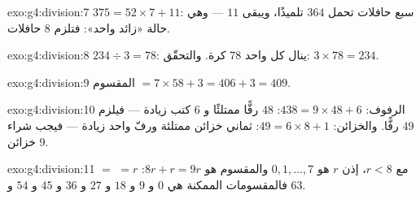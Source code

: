 \begin{solution}{exo:g4:division:7}
$375 = 52 \times 7 + 11$: سبع حافلات تحمل $364$ تلميذًا، ويبقى
$11$ --- وهي حالة «زائد واحد»: فتلزم $8$ حافلات.
\end{solution}

\begin{solution}{exo:g4:division:8}
$234 \div 3 = 78$: ينال كل واحد $78$ كرة. والتحقّق:
$3 \times 78 = 234$.
\end{solution}

\begin{solution}{exo:g4:division:9}
المقسوم $= 7 \times 58 + 3 = 406 + 3 = 409$.
\end{solution}

\begin{solution}{exo:g4:division:10}
الرفوف: $438 = 9 \times 48 + 6$: $48$ رفًّا ممتلئًا و $6$ كتب
زيادة --- فيلزم $49$ رفًّا. والخزائن:
$49 = 6 \times 8 + 1$: ثماني خزائن ممتلئة ورفّ واحد زيادة ---
فيجب شراء $9$ خزائن.
\end{solution}

\begin{solution}{exo:g4:division:11}
 $=$  $= r$ مع $r < 8$، إذن $r$ هو $0, 1, \dots,
7$ والمقسوم هو $8r + r = 9r$: فالمقسومات الممكنة هي
$0$ و $9$ و $18$ و $27$ و $36$ و $45$ و $54$ و $63$.
\end{solution}
